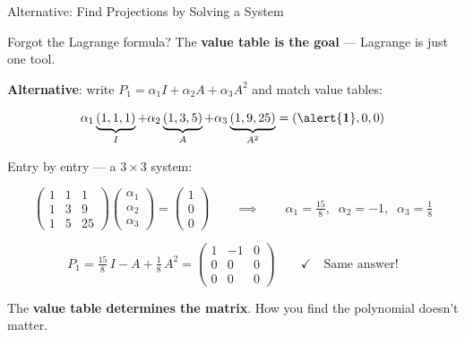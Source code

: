 \documentclass[10pt]{beamer}
\theoremstyle{definition}
\newcommand{\x}[1]{\alert{\textbf{#1}}}
\begin{document}
%
%
\begin{frame}[shrink=5]{Alternative: Find Projections by Solving a System}

Forgot the Lagrange formula? The \x{value table is the goal} --- Lagrange is just one tool.

\vfill

\x{Alternative}: write $P_1 = \alpha_1 I + \alpha_2 A + \alpha_3 A^2$ and match value tables:

$$\alpha_1 \underbrace{(1,1,1)}_{I} + \alpha_2 \underbrace{(1,3,5)}_{A} + \alpha_3 \underbrace{(1,9,25)}_{A^2} = (\x{1},0,0)$$

\vfill

Entry by entry --- a $3 \times 3$ system:

$$\begin{pmatrix}1&1&1\\1&3&9\\1&5&25\end{pmatrix}\begin{pmatrix}\alpha_1\\\alpha_2\\\alpha_3\end{pmatrix} = \begin{pmatrix}1\\0\\0\end{pmatrix} \qquad\implies\qquad \alpha_1 = \tfrac{15}{8},\;\; \alpha_2 = -1,\;\; \alpha_3 = \tfrac{1}{8}$$

\vfill\pause

$$P_1 = \tfrac{15}{8}\,I - A + \tfrac{1}{8}\,A^2 = \begin{pmatrix}1&-1&0\\0&0&0\\0&0&0\end{pmatrix} \qquad \checkmark \quad\text{Same answer!}$$

\vfill

The \x{value table determines the matrix}. How you find the polynomial doesn't matter.

\end{frame}
\end{document}
